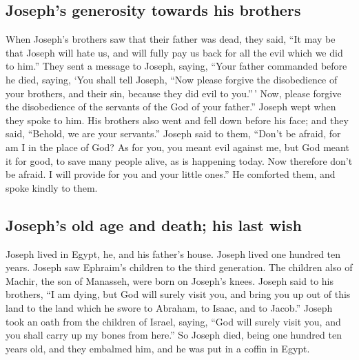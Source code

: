 \hypertarget{josephs-generosity-towards-his-brothers}{%
\subsection{Joseph's generosity towards his
brothers}\label{josephs-generosity-towards-his-brothers}}

 When Joseph's brothers saw that their father was dead,
they said, ``It may be that Joseph will hate us, and will fully pay us
back for all the evil which we did to him.''  They sent a
message to Joseph, saying, ``Your father commanded before he died,
saying,  `You shall tell Joseph, ``Now please forgive the
disobedience of your brothers, and their sin, because they did evil to
you.''\,' Now, please forgive the disobedience of the servants of the
God of your father.'' Joseph wept when they spoke to him.
 His brothers also went and fell down before his face;
and they said, ``Behold, we are your servants.''  Joseph
said to them, ``Don't be afraid, for am I in the place of God?
 As for you, you meant evil against me, but God meant it
for good, to save many people alive, as is happening today.
 Now therefore don't be afraid. I will provide for you
and your little ones.'' He comforted them, and spoke kindly to them.

\hypertarget{josephs-old-age-and-death-his-last-wish}{%
\subsection{Joseph's old age and death; his last
wish}\label{josephs-old-age-and-death-his-last-wish}}

 Joseph lived in Egypt, he, and his father's house.
Joseph lived one hundred ten years.  Joseph saw Ephraim's
children to the third generation. The children also of Machir, the son
of Manasseh, were born on Joseph's knees.  Joseph said to
his brothers, ``I am dying, but God will surely visit you, and bring you
up out of this land to the land which he swore to Abraham, to Isaac, and
to Jacob.''  Joseph took an oath from the children of
Israel, saying, ``God will surely visit you, and you shall carry up my
bones from here.''  So Joseph died, being one hundred ten
years old, and they embalmed him, and he was put in a coffin in Egypt.
